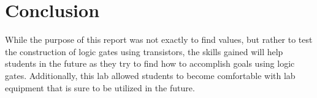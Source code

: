 \documentclass[11pt]{article}
\begin{document}
\section*{Conclusion}

While the purpose of this report was not exactly to find values, but rather to test the construction of logic gates using transistors, the skills gained will help students in the future as they try to find how to accomplish goals using logic gates. Additionally, this lab allowed students to become comfortable with lab equipment that is sure to be utilized in the future.
\end{document}
